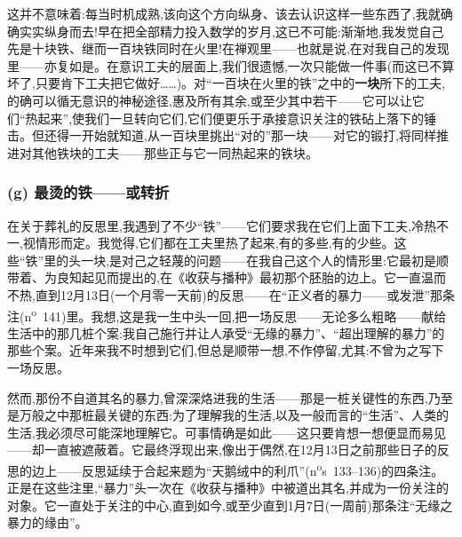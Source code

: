 \dmark{}这并不意味着:每当时机成熟,该向这个方向纵身、该去认识这样一些东西了,我就确确实实纵身而去!早在把全部精力投入数学的岁月,这已不可能:渐渐地,我发觉自己先是十块铁、继而一百块铁同时在火里!在禅观里——也就是说,在对我自己的发现里——亦复如是。在意识工夫的层面上,我们很遗憾,一次只能做一件事(而这已不算坏了,只要肯下工夫把它做好……)。对“一百块在火里的铁”之中的\textbf{一块}所下的工夫,的确可以循无意识的神秘途径,惠及所有其余,或至少其中若干——它可以让它们“热起来”,使我们一旦转向它们,它们便更乐于承接意识关注的铁砧上落下的锤击。但还得一开始就知道,从一百块里挑出“对的”那一块——对它的锻打,将同样推进对其他铁块的工夫——那些正与它一同热起来的铁块。

\subsubsection*{(g) 最烫的铁——或转折}
\label{ch18:local:h77}

\label{ch18:local:n72}

在关于葬礼的反思里,我遇到了不少“铁”——它们要求我在它们上面下工夫,冷热不一,视情形而定。我觉得,它们都在工夫里热了起来,有的多些,有的少些。这些“铁”里的头一块,是对己之轻蔑的问题——在我自己这个人的情形里:它最初是顺带着、为良知起见而提出的,在《收获与播种》最初那个胚胎的边上。它一直温而不热,直到12月13日(一个月零一天前)的反思——在“正义者的暴力——或发泄”那条注(n\textsuperscript{o}~141)里。我想,这是我一生中头一回,把一场反思——无论多么粗略——献给生活中的那几桩个案:我自己施行并让人承受“无缘的暴力”、“超出理解的暴力”的那些个案。近年来我不时想到它们,但总是顺带一想,不作停留,尤其:不曾为之写下一场反思。

然而,那份不自道其名的暴力,曾深深烙进我的生活——那是一桩关键性的东西,乃至是万般之中那桩最关键的东西:为了理解我的生活,以及一般而言的“生活”、人类的生活,我必须尽可能深地\dmark{}理解它。可事情确是如此——这只要肯想一想便显而易见——却一直被遮蔽着。它最终浮现出来,像出于偶然,在12月13日之前那些日子的反思的边上——反思延续于合起来题为“天鹅绒中的利爪”(n\textsuperscript{o}s~133--136)的四条注。正是在这些注里,“暴力”头一次在《收获与播种》中被道出其名,并成为一份关注的对象。它一直处于关注的中心,直到如今,或至少直到1月7日(一周前)那条注“无缘之暴力的缘由”。


